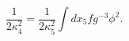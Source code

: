 \begin{equation}
\frac{1}{2\kappa_4^2}=\frac{1}{2\kappa_5^2}\int dx_5 fg^{-3} \phi^2.
\end{equation}


